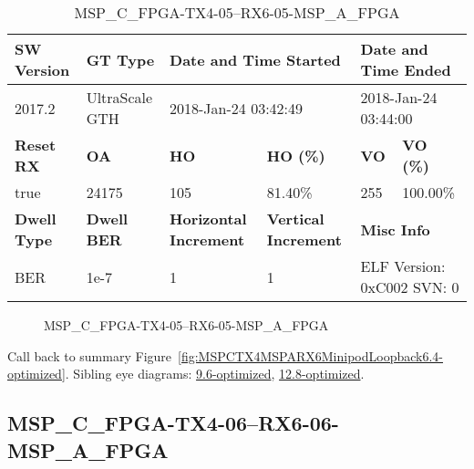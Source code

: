 \begin{table}[h]
\centering
\caption{MSP\_C\_FPGA-TX4-05--RX6-05-MSP\_A\_FPGA}
\label{tab:MSPCFPGATX405RX605MSPAFPGA6.4-optimized}
\begin{tabular}{@{}|l|l|l|l|l|l|@{}}
\toprule
\textbf{SW Version}                & \textbf{GT Type}   & \multicolumn{2}{l|}{\textbf{Date and Time Started}}            & \multicolumn{2}{l|}{\textbf{Date and Time Ended}}        \\ \midrule
2017.2                       & UltraScale GTH          & \multicolumn{2}{l|}{2018-Jan-24 03:42:49}                   & \multicolumn{2}{l|}{2018-Jan-24 03:44:00}               \\ \midrule
\textbf{Reset RX}                  & \textbf{OA} & \textbf{HO}   & \textbf{HO (\%)} & \textbf{VO} & \textbf{VO (\%)} \\ \midrule
true & 24175        & 105          & 81.40\%        & 255        & 100.00\%       \\ \midrule
\textbf{Dwell Type}                & \textbf{Dwell BER} & \textbf{Horizontal Increment} & \textbf{Vertical Increment}    & \multicolumn{2}{l|}{\textbf{Misc Info}}                  \\ \midrule
BER                            & 1e-7        & 1        & 1           & \multicolumn{2}{l|}{ELF Version: 0xC002 SVN: 0}                         \\ \bottomrule
\end{tabular}
\end{table}

\begin{figure}[h]
\caption{MSP\_C\_FPGA-TX4-05--RX6-05-MSP\_A\_FPGA} \label{fig:MSPCFPGATX405RX605MSPAFPGA6.4-optimized}
\end{figure}

Call back to summary Figure~\ref{fig:MSPCTX4MSPARX6MinipodLoopback6.4-optimized}.
Sibling eye diagrams: \hyperref[sec:MSPCFPGATX405RX605MSPAFPGA9.6-optimized]{9.6-optimized}, \hyperref[sec:MSPCFPGATX405RX605MSPAFPGA12.8-optimized]{12.8-optimized}.

\clearpage
\newpage


\subsection{MSP\_C\_FPGA-TX4-06--RX6-06-MSP\_A\_FPGA}\label{sec:MSPCFPGATX406RX606MSPAFPGA6.4-optimized}

